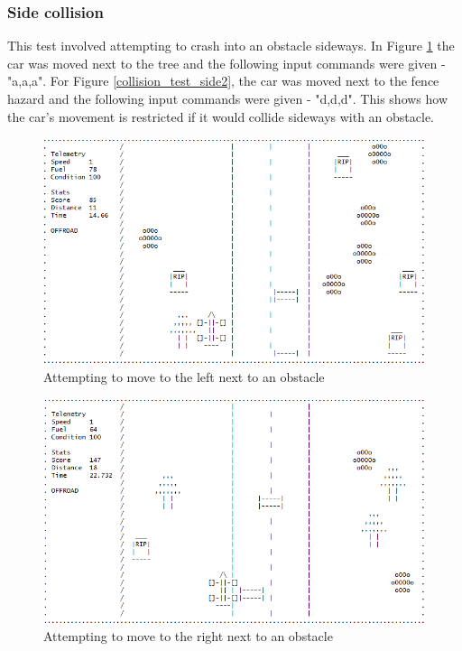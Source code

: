 \documentclass{article}
\begin{document}
\subsubsection*{Side collision}
This test involved attempting to crash into an obstacle sideways. In Figure \ref{fig:collision_test_side} the car was moved next to the tree and the following input commands were given - "a,a,a". For Figure \ref{collision_test_side2}, the car was moved next to the fence hazard and the following input commands were given - "d,d,d". This shows how the car's movement is restricted if it would collide sideways with an obstacle.
\begin{figure}[!ht]
	\begin{center}
	\includegraphics[width=0.63\paperwidth]{images/collision_test_side}
	\caption{Attempting to move to the left next to an obstacle}
	\label{fig:collision_test_side} 
	\end{center}
\end{figure}
\begin{figure}[!ht]
	\begin{center}
	\includegraphics[width=0.63\paperwidth]{images/collision_test_side2}
	\caption{Attempting to move to the right next to an obstacle}
	\label{fig:collision_test_side2} 
	\end{center}
\end{figure}
\end{document}
